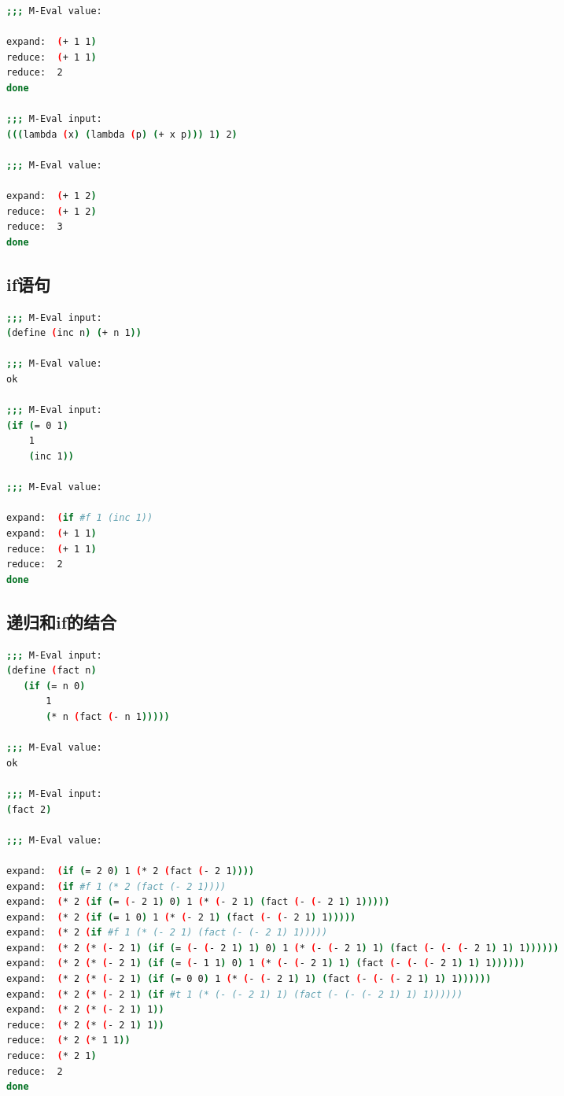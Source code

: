 \documentclass{article}
\begin{document}
\begin{CJK*}{UTF8}{gkai}
\begin{lstlisting}[language=bash, numbers=none, backgroundcolor=\color{black}, basicstyle=\scriptsize\color{green}\ttfamily\bfseries]
;;; M-Eval value:

expand:  (+ 1 1)
reduce:  (+ 1 1)
reduce:  2
done

;;; M-Eval input:
(((lambda (x) (lambda (p) (+ x p))) 1) 2)

;;; M-Eval value:

expand:  (+ 1 2)
reduce:  (+ 1 2)
reduce:  3
done

\end{lstlisting}

\subsection{if语句}

\begin{lstlisting}[language=bash, numbers=none, backgroundcolor=\color{black}, basicstyle=\scriptsize\color{green}\ttfamily\bfseries]
;;; M-Eval input:
(define (inc n) (+ n 1))

;;; M-Eval value:
ok

;;; M-Eval input:
(if (= 0 1)
    1
    (inc 1))

;;; M-Eval value:

expand:  (if #f 1 (inc 1))
expand:  (+ 1 1)
reduce:  (+ 1 1)
reduce:  2
done

\end{lstlisting}

\subsection{递归和if的结合}

\begin{lstlisting}[language=bash, numbers=none, backgroundcolor=\color{black}, basicstyle=\scriptsize\color{green}\ttfamily\bfseries]
;;; M-Eval input:
(define (fact n)
   (if (= n 0)
       1
       (* n (fact (- n 1)))))

;;; M-Eval value:
ok

;;; M-Eval input:
(fact 2)

;;; M-Eval value:

expand:  (if (= 2 0) 1 (* 2 (fact (- 2 1))))
expand:  (if #f 1 (* 2 (fact (- 2 1))))
expand:  (* 2 (if (= (- 2 1) 0) 1 (* (- 2 1) (fact (- (- 2 1) 1)))))
expand:  (* 2 (if (= 1 0) 1 (* (- 2 1) (fact (- (- 2 1) 1)))))
expand:  (* 2 (if #f 1 (* (- 2 1) (fact (- (- 2 1) 1)))))
expand:  (* 2 (* (- 2 1) (if (= (- (- 2 1) 1) 0) 1 (* (- (- 2 1) 1) (fact (- (- (- 2 1) 1) 1))))))
expand:  (* 2 (* (- 2 1) (if (= (- 1 1) 0) 1 (* (- (- 2 1) 1) (fact (- (- (- 2 1) 1) 1))))))
expand:  (* 2 (* (- 2 1) (if (= 0 0) 1 (* (- (- 2 1) 1) (fact (- (- (- 2 1) 1) 1))))))
expand:  (* 2 (* (- 2 1) (if #t 1 (* (- (- 2 1) 1) (fact (- (- (- 2 1) 1) 1))))))
expand:  (* 2 (* (- 2 1) 1))
reduce:  (* 2 (* (- 2 1) 1))
reduce:  (* 2 (* 1 1))
reduce:  (* 2 1)
reduce:  2
done


\end{lstlisting}
\end{CJK*}
\end{document}
